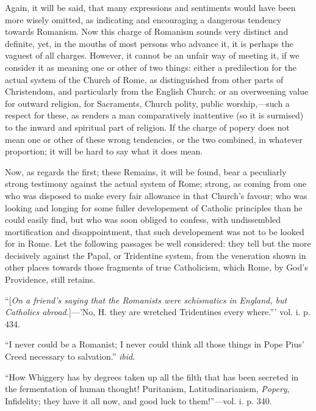 Again, it will be said, that
many expressions and sentiments would have been more wisely omitted,
as indicating and encouraging a dangerous tendency towards Romanism.
Now this charge of Romanism sounds very distinct and definite, yet, in
the mouths of most persons who advance it, it is perhaps the vaguest
of all charges. However, it cannot be an unfair way of meeting it,
if we consider it as meaning one or other of two things: either a
predilection for the actual system of the Church of Rome, as
distinguished from other parts of Christendom, and particularly from
the English Church: or an overweening value for outward religion, for
Sacraments, Church polity, public worship,—such a respect for these,
as renders a man comparatively inattentive (so it is surmised) to the
inward and spiritual part of religion. If the charge of popery does
not mean one or other of these wrong tendencies, or the two combined,
in whatever proportion; it will be hard to say what it does mean.

Now, as regards the first;
these Remains, it will be found, bear a peculiarly strong testimony
against the actual system of Rome; strong, as coming from one who was
disposed to make every fair allowance in that Church's favour; who was
looking and longing for some fuller developement of Catholic
principles than he could easily find, but who was soon obliged to
confess, with undissembled mortification and disappointment, that such
developement was not to be looked for in Rome. Let the following
passages be well considered: they tell but the more decisively against
the Papal, or Tridentine system, from the veneration shown in
other places towards those fragments of true Catholicism, which Rome,
by God's Providence, still retains.

``[\emph{On a friend's saying that
the Romanists were schismatics in England, but Catholics abroad.}]—'No,
H. they are wretched Tridentines every where.''' vol. i. p. 434.

``I never could be a Romanist;
I never could think all those things in Pope Pius' Creed necessary to
salvation.'' \emph{ibid}.

``How Whiggery has by degrees
taken up all the filth that has been secreted in the fermentation of
human thought! Puritanism, Latitudinarianism, \emph{Popery},
Infidelity; they have it all now, and good luck to them!''—vol. i. p.
340.

